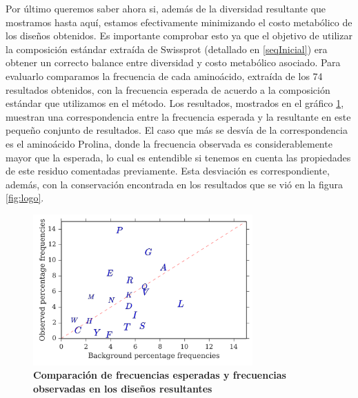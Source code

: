 Por último queremos saber ahora si, además de la diversidad resultante que mostramos hasta aquí, estamos efectivamente minimizando el costo metabólico de los diseños obtenidos.
Es importante comprobar esto ya que el objetivo de utilizar la composición estándar extraída de Swissprot (detallado en \ref{seqInicial}) era obtener un correcto balance entre diversidad y costo metabólico asociado.
Para evaluarlo comparamos la frecuencia de cada aminoácido, extraída de los 74 resultados obtenidos, con la frecuencia esperada de acuerdo a la composición estándar que utilizamos en el método.
Los resultados, mostrados en el gráfico \ref{fig:frequencies}, muestran una correspondencia entre la frecuencia esperada y la resultante en este pequeño conjunto de resultados.
El caso que más se desvía de la correspondencia es el aminoácido Prolina, donde la frecuencia observada es considerablemente mayor que la esperada, lo cual es entendible si tenemos en cuenta las propiedades 
de este residuo comentadas previamente. Esta desviación es correspondiente, además, con la conservación encontrada en los resultados que se vió en la figura \ref{fig:logo}.





\begin{figure}[htbp]
\centering
\includegraphics[width=0.75\textwidth]{img/resultados/frequenciesComparison.png}
\caption{\textbf{Comparación de frecuencias esperadas y frecuencias observadas en los diseños resultantes}}
\label{fig:frequencies}
\end{figure}

